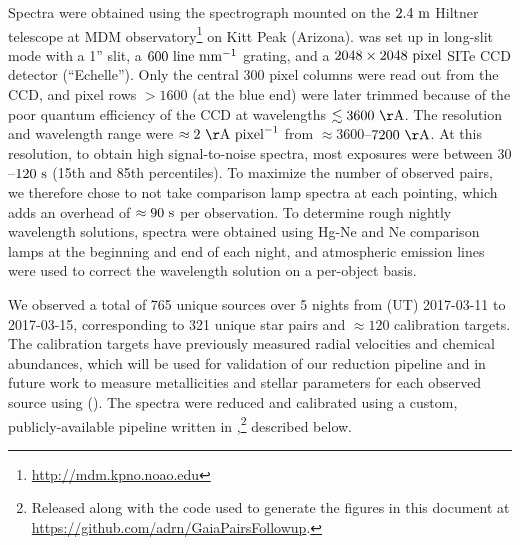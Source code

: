 \documentclass[modern, letterpaper]{aastex61}
\begin{document}
Spectra were obtained using the  spectrograph mounted on the
$2.4~{\rm m}$ Hiltner telescope at MDM
observatory\footnote{\url{http://mdm.kpno.noao.edu}} on Kitt Peak (Arizona).
 was set up in long-slit mode with a 1'' slit, a $600~{\rm
line}~{\rm mm}^{-1}$ grating, and a $2048\times2048~{\rm pixel}$ SITe CCD
detector (``Echelle'').
Only the central 300 pixel columns were read out from the CCD, and pixel rows
$>1600$ (at the blue end) were later trimmed because of the poor quantum
efficiency of the CCD at wavelengths $\lesssim 3600~{\rm \AA}$.
The resolution and wavelength range were $\approx2~{\rm \AA}~{\rm pixel}^{-1}$
from $\approx 3600$--$7200~{\rm \AA}$.
At this resolution, to obtain high signal-to-noise spectra, most exposures were
between $30$--$120~{\rm s}$ (15th and 85th percentiles).
To maximize the number of observed pairs, we therefore chose to not take
comparison lamp spectra at each pointing, which adds an overhead of $\approx
90~{\rm s}$ per observation.
To determine rough nightly wavelength solutions, spectra were obtained using
Hg-Ne and Ne comparison lamps at the beginning and end of each night, and
atmospheric emission lines were used to correct the wavelength solution on a
per-object basis.

We observed a total of 765 unique sources over 5 nights from (UT) 2017-03-11 to
2017-03-15, corresponding to 321 unique star pairs and $\approx 120$
calibration targets.
The calibration targets have previously measured radial velocities and chemical
abundances, which will be used for validation of our reduction pipeline and in
future work to measure metallicities and stellar parameters for each observed
source using  (\citealt{Ness:TODO}).
The spectra were reduced and calibrated using a custom, publicly-available
pipeline written in \python,\footnote{Released along with the code used to
generate the figures in this document at
\url{https://github.com/adrn/GaiaPairsFollowup}.} described below.
\end{document}
